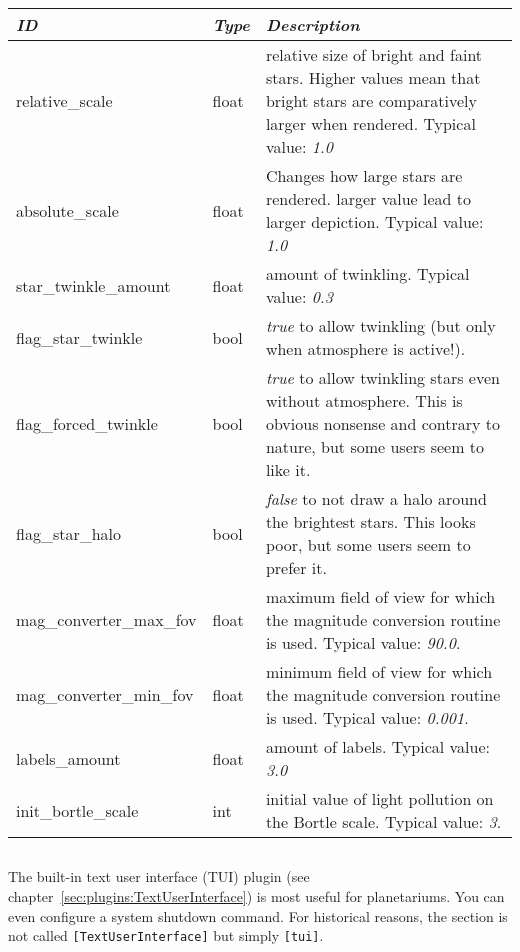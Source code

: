 \noindent%
\begin{tabularx}{\textwidth}{l|l|X}\toprule
\emph{ID}                & \emph{Type} & \emph{Description}\\\midrule
relative\_scale          & float       & relative size of bright and faint stars. Higher values mean that bright stars 
                                         are comparatively larger when rendered. Typical value: \emph{1.0}\\%
absolute\_scale          & float       & Changes how large stars are rendered. larger value lead to larger depiction. Typical value: \emph{1.0}\\%
star\_twinkle\_amount    & float       & amount of twinkling. Typical value: \emph{0.3}\\%
flag\_star\_twinkle      & bool        & \emph{true} to allow twinkling (but only when atmosphere is active!).\\%
flag\_forced\_twinkle    & bool        & \emph{true} to allow twinkling stars even without atmosphere. This is obvious nonsense and contrary to nature, but some users seem to like it.\\%
flag\_star\_halo         & bool        & \emph{false} to not draw a halo around the brightest stars. This looks poor, but some users seem to prefer it.\\%
mag\_converter\_max\_fov & float       & maximum field of view for which the magnitude conversion routine is used. Typical value: \emph{90.0}.\\%
mag\_converter\_min\_fov & float       & minimum field of view for which the magnitude conversion routine is used. Typical value: \emph{0.001}.\\%
labels\_amount           & float       & amount of labels. Typical value: \emph{3.0}\\%
init\_bortle\_scale      & int         & initial value of light pollution on the Bortle scale. Typical value: \emph{3}.\\\bottomrule
\end{tabularx}

\subsection{}

The built-in text user interface (TUI) plugin (see chapter~\ref{sec:plugins:TextUserInterface}) is most useful for planetariums. You can even configure a system shutdown command. 
For historical reasons, the section is not called \texttt{[TextUserInterface]} but simply \texttt{[tui]}.


